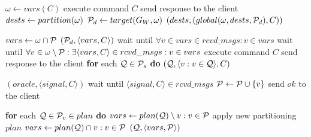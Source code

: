 \begin{algorithm}[h!]
\small

\begin{distribalgo}[1]

	\STATE $\omega \leftarrow vars(C)$
		\STATE execute command $C$
		\STATE send response to the client
			\STATE $dests \leftarrow partition(\omega)$
			\STATE $\mathcal{P}_d \leftarrow target(G_W, \omega)$
			\STATE \amcast$(dests, (global(\omega,dests,\mathcal{P}_d), C))$
	\ENDIF
\ENDINDENT

\vspace{1.0mm}
		\STATE $vars \leftarrow \omega \cap \mathcal{P}$
		\STATE \rmcast$(\mathcal{P}_d, \langle vars, C \rangle)$
		\STATE wait until $\forall v \in vars \in rcvd\_msgs : v \in vars$
		\STATE wait until $\forall v \in \omega \setminus \mathcal{P}: \exists \langle vars, C \rangle \in rcvd\_msgs :v \in vars$
		\STATE execute command $C$
		\STATE send response to the client
		\STATE \textbf{for} each $\mathcal{Q} \in \mathcal{P}_s$ \textbf{do} \rmcast$(\mathcal{Q}, \langle v:v \in \mathcal{Q} \rangle, C)$
	\ENDIF
\ENDINDENT

\vspace{1.0mm}
	\STATE \rmcast$(oracle, \langle signal, C \rangle )$
	\STATE wait until $\langle signal, C \rangle \in rcvd\_msgs$
	\STATE $\mathcal{P} \leftarrow \mathcal{P} \cup \{v\}$
	\STATE send $ok$ to the client
\ENDINDENT

\vspace{1.0mm}
	\STATE \textbf{for} each $\mathcal{Q} \in \mathcal{P}_v \in plan$ \textbf{do} 
			\STATE $vars \leftarrow plan(\mathcal{Q}) \setminus v:v \in \mathcal{P}$
				\STATE apply new partitioning $plan$
			\ENDIF
		\ELSE 
			\STATE $vars \leftarrow plan(\mathcal{Q}) \cap v:v \in \mathcal{P}$
			\STATE \rmcast$(\mathcal{Q}, \langle vars, \mathcal{P} \rangle )$
		\ENDIF
\ENDINDENT


\end{distribalgo}
\end{algorithm}
